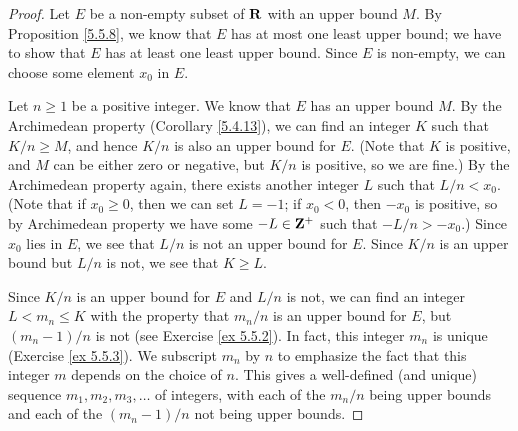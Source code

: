 \begin{proof}
    Let \(E\) be a non-empty subset of \(\mathbf{R}\) with an upper bound \(M\).
    By Proposition \ref{5.5.8}, we know that \(E\) has at most one least upper bound;
    we have to show that \(E\) has at least one least upper bound.
    Since \(E\) is non-empty, we can choose some element \(x_0\) in \(E\).

    Let \(n \geq 1\) be a positive integer.
    We know that \(E\) has an upper bound \(M\).
    By the Archimedean property (Corollary \ref{5.4.13}), we can find an integer \(K\) such that \(K / n \geq M\), and hence \(K / n\) is also an upper bound for \(E\).
    (Note that \(K\) is positive, and \(M\) can be either zero or negative, but \(K / n\) is positive, so we are fine.)
    By the Archimedean property again, there exists another integer \(L\) such that \(L / n < x_0\).
    (Note that if \(x_0 \geq 0\), then we can set \(L = -1\); if \(x_0 < 0\), then \(-x_0\) is positive, so by Archimedean property we have some \(-L \in \mathbf{Z}^+\) such that \(-L / n > -x_0\).)
    Since \(x_0\) lies in \(E\), we see that \(L / n\) is not an upper bound for \(E\).
    Since \(K / n\) is an upper bound but \(L / n\) is not, we see that \(K \geq L\).

    Since \(K / n\) is an upper bound for \(E\) and \(L / n\) is not, we can find an integer \(L < m_n \leq K\) with the property that \(m_n / n\) is an upper bound for \(E\), but \((m_n - 1) / n\) is not (see Exercise \ref{ex 5.5.2}).
    In fact, this integer \(m_n\) is unique (Exercise \ref{ex 5.5.3}).
    We subscript \(m_n\) by \(n\) to emphasize the fact that this integer \(m\) depends on the choice of \(n\).
    This gives a well-defined (and unique) sequence \(m_1, m_2, m_3, \dots\) of integers, with each of the \(m_n / n\) being upper bounds and each of the \((m_n - 1) / n\) not being upper bounds.


\end{proof}
